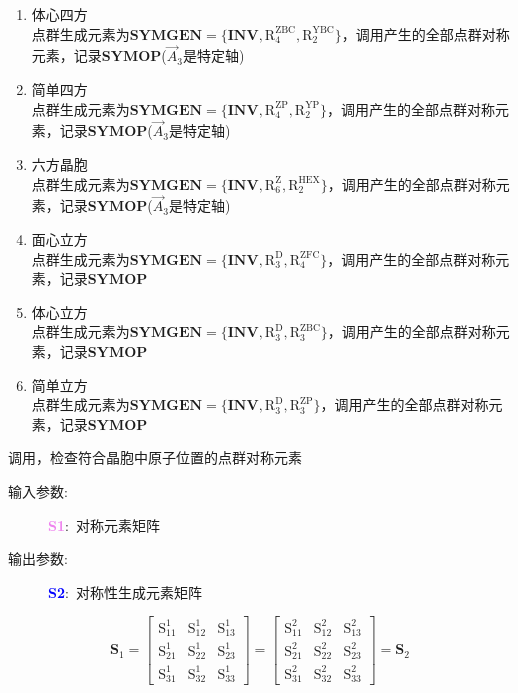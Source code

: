 \documentclass{article}      %
\begin{document}
\begin{enumerate}
	\item 体心四方\\点群生成元素为$\mathbf{SYMGEN}=\{\mathbf{INV},\mathrm{R}_4^{\mathrm{ZBC}},\mathrm{R}_2^{\mathrm{YBC}}\}$，调用产生的全部点群对称元素，记录$\mathbf{SYMOP}$($\vec A_3$是特定轴)
	\item 简单四方\\点群生成元素为$\mathbf{SYMGEN}=\{\mathbf{INV},\mathrm{R}_4^{\mathrm{ZP}},\mathrm{R}_2^{\mathrm{YP}}\}$，调用产生的全部点群对称元素，记录$\mathbf{SYMOP}$($\vec A_3$是特定轴)
	\item 六方晶胞\\点群生成元素为$\mathbf{SYMGEN}=\{\mathbf{INV},\mathrm{R}_6^{\mathrm{Z}},\mathrm{R}_2^{\mathrm{HEX}}\}$，调用产生的全部点群对称元素，记录$\mathbf{SYMOP}$($\vec A_3$是特定轴)
	\item 面心立方\\点群生成元素为$\mathbf{SYMGEN}=\{\mathbf{INV},\mathrm{R}_3^{\mathrm{D}},\mathrm{R}_4^{\mathrm{ZFC}}\}$，调用产生的全部点群对称元素，记录$\mathbf{SYMOP}$
	\item 体心立方\\点群生成元素为$\mathbf{SYMGEN}=\{\mathbf{INV},\mathrm{R}_3^{\mathrm{D}},\mathrm{R}_3^{\mathrm{ZBC}}\}$，调用产生的全部点群对称元素，记录$\mathbf{SYMOP}$
	\item 简单立方\\点群生成元素为$\mathbf{SYMGEN}=\{\mathbf{INV},\mathrm{R}_3^{\mathrm{D}},\mathrm{R}_3^{\mathrm{ZP}}\}$，调用产生的全部点群对称元素，记录$\mathbf{SYMOP}$
\end{enumerate}

调用，检查符合晶胞中原子位置的点群对称元素

\vskip 30pt
\begin{description}
	\item[输入参数:~]\textcolor{violet}{\textbf{S1}}:~对称元素矩阵
	\item[输出参数:~]\textcolor{blue}{\textbf{S2}}:~对称性生成元素矩阵
\end{description}
\begin{displaymath}\mathbf{S}_1=
	\begin{bmatrix}
		\mathrm{S}_{11}^1 &\mathrm{S}_{12}^1 &\mathrm{S}_{13}^1\\
		\mathrm{S}_{21}^1 &\mathrm{S}_{22}^1 &\mathrm{S}_{23}^1\\
		\mathrm{S}_{31}^1 &\mathrm{S}_{32}^1 &\mathrm{S}_{33}^1
	\end{bmatrix}=
	\begin{bmatrix}
		\mathrm{S}_{11}^2 &\mathrm{S}_{12}^2 &\mathrm{S}_{13}^2\\
		\mathrm{S}_{21}^2 &\mathrm{S}_{22}^2 &\mathrm{S}_{23}^2\\
		\mathrm{S}_{31}^2 &\mathrm{S}_{32}^2 &\mathrm{S}_{33}^2
	\end{bmatrix}=\mathbf{S}_2
\end{displaymath}
\end{document}
